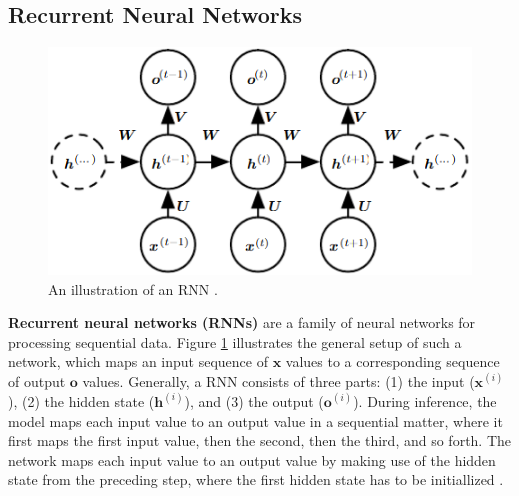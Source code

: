\documentclass[./main.tex]{subfiles}
\begin{document}
\subsection{Recurrent Neural Networks}
\begin{figure}[htbp]
    \centering
    \includegraphics[width = 0.5 \textwidth]{./entities/rnn_illustration.PNG}
    \caption{An illustration of an RNN \cite{DL_book}.}
    \label{fig:rnn_illustration}
\end{figure}
\noindent \textbf{Recurrent neural networks (RNNs)} are a family of neural networks for processing sequential data. Figure \ref{fig:rnn_illustration} illustrates the general setup of such a network, which maps an input sequence of $\bm{x}$ values to a corresponding sequence of output $\bm{o}$ values. Generally, a RNN consists of three parts: (1) the input ($\bm{x}^{(i)}$), (2) the hidden state ($\bm{h}^{(i)}$), and (3) the output ($\bm{o}^{(i)}$). During inference, the model maps each input value to an output value in a sequential matter, where it first maps the first input value, then the second, then the third, and so forth. The network maps each input value to an output value by making use of the hidden state from the preceding step, where the first hidden state has to be initiallized \cite{DL_book}.
\end{document}
